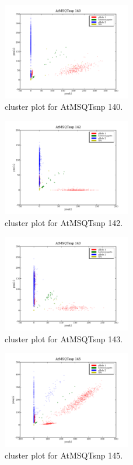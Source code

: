 \begin{figure}[H]
\includegraphics[width=0.5\textwidth]{figures/cluster_plot_AtMSQTsnp_140.png}
\caption{cluster plot for AtMSQTsnp 140.} \label{flAtMSQTsnp140}
\end{figure}

\begin{figure}[H]
\includegraphics[width=0.5\textwidth]{figures/cluster_plot_AtMSQTsnp_142.png}
\caption{cluster plot for AtMSQTsnp 142.} \label{flAtMSQTsnp142}
\end{figure}

\begin{figure}[H]
\includegraphics[width=0.5\textwidth]{figures/cluster_plot_AtMSQTsnp_143.png}
\caption{cluster plot for AtMSQTsnp 143.} \label{flAtMSQTsnp143}
\end{figure}

\begin{figure}[H]
\includegraphics[width=0.5\textwidth]{figures/cluster_plot_AtMSQTsnp_145.png}
\caption{cluster plot for AtMSQTsnp 145.} \label{flAtMSQTsnp145}
\end{figure}

